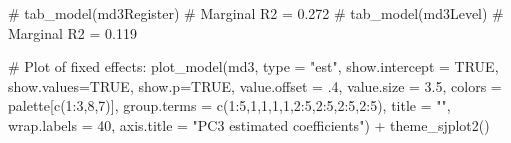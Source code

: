 \documentclass[
  letterpaper,
  DIV=11,
  numbers=noendperiod]{scrreprt}
\newenvironment{Shaded}{\begin{snugshade}}{\end{snugshade}}
\newcommand{\AttributeTok}[1]{\textcolor[rgb]{0.40,0.45,0.13}{#1}}
\newcommand{\CommentTok}[1]{\textcolor[rgb]{0.37,0.37,0.37}{#1}}
\newcommand{\ConstantTok}[1]{\textcolor[rgb]{0.56,0.35,0.01}{#1}}
\newcommand{\DecValTok}[1]{\textcolor[rgb]{0.68,0.00,0.00}{#1}}
\newcommand{\FloatTok}[1]{\textcolor[rgb]{0.68,0.00,0.00}{#1}}
\newcommand{\FunctionTok}[1]{\textcolor[rgb]{0.28,0.35,0.67}{#1}}
\newcommand{\NormalTok}[1]{\textcolor[rgb]{0.00,0.23,0.31}{#1}}
\newcommand{\SpecialCharTok}[1]{\textcolor[rgb]{0.37,0.37,0.37}{#1}}
\newcommand{\StringTok}[1]{\textcolor[rgb]{0.13,0.47,0.30}{#1}}
\begin{document}
\begin{Shaded}
\begin{Highlighting}[]
\CommentTok{\# tab\_model(md3Register) \# Marginal R2 = 0.272}
\CommentTok{\# tab\_model(md3Level) \# Marginal R2 = 0.119}

\CommentTok{\# Plot of fixed effects:}
\FunctionTok{plot\_model}\NormalTok{(md3, }
           \AttributeTok{type =} \StringTok{"est"}\NormalTok{,}
           \AttributeTok{show.intercept =} \ConstantTok{TRUE}\NormalTok{,}
           \AttributeTok{show.values=}\ConstantTok{TRUE}\NormalTok{, }
           \AttributeTok{show.p=}\ConstantTok{TRUE}\NormalTok{,}
           \AttributeTok{value.offset =}\NormalTok{ .}\DecValTok{4}\NormalTok{,}
           \AttributeTok{value.size =} \FloatTok{3.5}\NormalTok{,}
           \AttributeTok{colors =}\NormalTok{ palette[}\FunctionTok{c}\NormalTok{(}\DecValTok{1}\SpecialCharTok{:}\DecValTok{3}\NormalTok{,}\DecValTok{8}\NormalTok{,}\DecValTok{7}\NormalTok{)],}
           \AttributeTok{group.terms =} \FunctionTok{c}\NormalTok{(}\DecValTok{1}\SpecialCharTok{:}\DecValTok{5}\NormalTok{,}\DecValTok{1}\NormalTok{,}\DecValTok{1}\NormalTok{,}\DecValTok{1}\NormalTok{,}\DecValTok{1}\NormalTok{,}\DecValTok{2}\SpecialCharTok{:}\DecValTok{5}\NormalTok{,}\DecValTok{2}\SpecialCharTok{:}\DecValTok{5}\NormalTok{,}\DecValTok{2}\SpecialCharTok{:}\DecValTok{5}\NormalTok{,}\DecValTok{2}\SpecialCharTok{:}\DecValTok{5}\NormalTok{), }
           \AttributeTok{title =} \StringTok{""}\NormalTok{,}
           \AttributeTok{wrap.labels =} \DecValTok{40}\NormalTok{,}
           \AttributeTok{axis.title =} \StringTok{"PC3 estimated coefficients"}\NormalTok{) }\SpecialCharTok{+}
  \FunctionTok{theme\_sjplot2}\NormalTok{() }
\end{Highlighting}
\end{Shaded}
\end{document}
